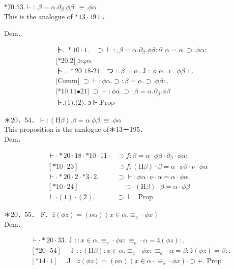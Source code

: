 \documentclass[10pt]{article}
\begin{document}
$* 20.53 . \vdash: . \beta=\alpha . \partial_{\beta} . \phi \beta: \equiv . \phi \alpha$\\
This is the analogue of $* 13 \cdot 191$ ．

Dem．


\begin{align*}
& \text { ト. } * 10 \cdot 1 . \quad \supset \vdash:, \beta=\alpha . \partial_{\beta} . \phi \beta: \partial: \alpha=\alpha . \supset . \phi \alpha: \\
& \text { [*20.2] ɔ:φα }  \tag{1}\\
& \text { ト . } * 20 \text { 18-21. } \text { つ }: . \beta=\alpha . \text { J : } \phi \text { α. ɔ . } \phi \beta \text { : . } \\
& \text { [Comm] } \supset \vdash: \phi \alpha . \supset: \beta=\alpha . \supset . \phi \beta: . \\
& \text { [*10.11•21] } \supset \vdash: \phi \alpha . \supset: \beta=\alpha . \partial_{\beta} . \phi \beta  \tag{2}\\
& \text { ト.(1).(2). ɔト.Prop }
\end{align*}


＊20．54．$\vdash:(\mathrm{H} \beta) . \beta=\alpha . \phi \beta . \equiv . \phi \alpha$\\
This proposition is the analogue of＊13－195．\\
Dem．

\[
\begin{array}{ll}
\vdash \cdot * 20 \cdot 18 \cdot * 10 \cdot 11 \cdot & \supset f: \beta=\alpha \cdot \phi \beta \cdot \partial_{\beta} \cdot \phi \alpha: \\
{[* 10 \cdot 23]} & \supset f:(\mathrm{H} \beta) \cdot \beta=\alpha \cdot \phi \beta \cdot \nu \cdot \phi \alpha \\
\vdash \cdot * 20 \cdot 2 \cdot * 3 \cdot 2 . & \supset \vdash: \phi \alpha \cdot \nu \cdot \alpha=\alpha \cdot \phi \alpha . \\
{[* 10 \cdot 24]} & \quad \supset \cdot(\mathrm{H} \beta) \cdot \beta=\alpha \cdot \phi \beta  \tag{2}\\
\vdash \cdot(1) \cdot(2) . & \supset \vdash . \text { Prop }
\end{array}
\]

＊20．55． F．$\hat{z}(\phi z)=(\nu \alpha)\left(x \in \alpha . \equiv_{x} \cdot \phi x\right)$\\
Dem．

$$
\begin{aligned}
& \vdash \cdot * 20 \cdot 33 . \text { J }:: x \in \alpha . \equiv_{x} \cdot \phi x: \equiv_{a} \cdot \alpha=\hat{z}(\phi z): . \\
& {[* 20 \cdot 54] \quad \text { J }::(\mathrm{H} \beta): x \in \alpha . \equiv_{x} \cdot \phi x: \equiv_{a} \cdot \alpha=\beta: \hat{z}(\phi z)=\beta: .} \\
& {[* 14 \cdot 1] \quad \text { J } \cdot \widehat{z}(\phi z)=(\nu \alpha)\left(x \in \alpha \cdot \equiv_{x} \cdot \phi x\right) \cdot \supset+. \text { Prop }}
\end{aligned}
$$
\end{document}
